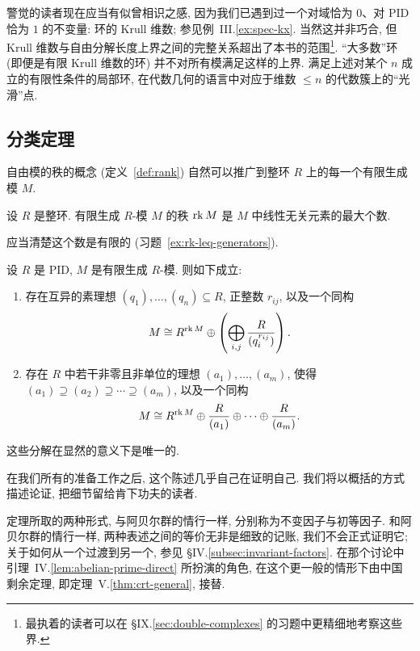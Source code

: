 警觉的读者现在应当有似曾相识之感, 因为我们已遇到过一个对域恰为 $0$、对 PID 恰为 $1$ 的不变量: 环的 Krull 维数; 参见例~III.\ref{ex:spec-kx}. 当然这并非巧合, 但 Krull 维数与自由分解长度上界之间的完整关系超出了本书的范围\footnote{最执着的读者可以在 §IX.\ref{sec:double-complexes} 的习题中更精细地考察这些界.}. ``大多数''环 (即便是有限 Krull 维数的环) 并不对所有模满足这样的上界. 满足上述对某个 $n$ 成立的有限性条件的局部环, 在代数几何的语言中对应于维数 $\le n$ 的代数簇上的``光滑''点.

\subsection{分类定理}\label{subsec:classification-theorem}

自由模的秩的概念 (定义~\ref{def:rank}) 自然可以推广到整环 $R$ 上的每一个有限生成模 $M$.

\begin{definition}\label{def:rank-fg}
设 $R$ 是整环. 有限生成 $R$-模 $M$ 的秩 $\operatorname{rk} M$ 是 $M$ 中线性无关元素的最大个数.
\end{definition}

应当清楚这个数是有限的 (习题~\ref{ex:rk-leq-generators}).

\begin{theorem}\label{thm:pid-classification}
设 $R$ 是 PID, $M$ 是有限生成 $R$-模. 则如下成立:
\begin{enumerate}
\item 存在互异的素理想 $(q_1),\ldots,(q_n)\subseteq R$, 正整数 $r_{ij}$, 以及一个同构
\[
M\cong R^{\operatorname{rk} M}\oplus\left(\bigoplus_{i,j}\frac{R}{(q_i^{r_{ij}})}\right).
\]
\item 存在 $R$ 中若干非零且非单位的理想 $(a_1),\ldots,(a_m)$, 使得 $(a_1)\supseteq(a_2)\supseteq\cdots\supseteq(a_m)$, 以及一个同构
\[
M\cong R^{\operatorname{rk} M}\oplus\frac{R}{(a_1)}\oplus\dots\oplus\frac{R}{(a_m)}.
\]
\end{enumerate}
这些分解在显然的意义下是唯一的.
\end{theorem}

在我们所有的准备工作之后, 这个陈述几乎自己在证明自己. 我们将以概括的方式描述论证, 把细节留给肯下功夫的读者.

定理所取的两种形式, 与阿贝尔群的情行一样, 分别称为不变因子与初等因子. 和阿贝尔群的情行一样, 两种表述之间的等价无非是细致的记账, 我们不会正式证明它; 关于如何从一个过渡到另一个, 参见 §IV.\ref{subsec:invariant-factors}. 在那个讨论中引理~IV.\ref{lem:abelian-prime-direct} 所扮演的角色, 在这个更一般的情形下由中国剩余定理, 即定理~V.\ref{thm:crt-general}, 接替.

